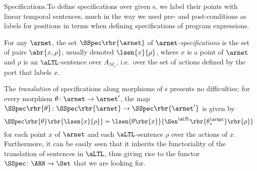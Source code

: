 \documentclass{LMCS}
\begin{document}
  \begin{minisection}{Specifications.}To define specifications over given s, we label their points with linear temporal sentences, much in the way we used pre- and post-conditions as labels for positions in terms when defining specifications of program expressions.

    \begin{defi}
      For any  \(\arnet\), the set \(\SSpec\rbr{\arnet}\) of \emph{\(\arnet\)\nb-specifications} is the set of pairs \(\abr{x, \rho}\), usually denoted \(\lsen{x}{\rho}\), where \(x\) is a point of \(\arnet\) and \(\rho\) is an \(\aLTL\)\nb-sentence over \(A_{M_{x}}\), i.e.\ over the set of actions defined by the port that labels \(x\).
    \end{defi}
    
    The \emph{translation} of specifications along morphisms of s presents no difficulties: for every morphism  \(\theta \colon \arnet \to \arnet'\), the map \(\SSpec\rbr{\theta} \colon \SSpec\rbr{\arnet} \to \SSpec\rbr{\arnet'}\) is given by
    \[
    \SSpec\rbr{\theta}\rbr{\lsen{x}{\rho}} = \lsen{\theta\rbr{x}}{\Sen^{\aLTL}\rbr{\theta^{\arnpt}_{x}}\rbr{\rho}}
    \]
    for each point \(x\) of \(\arnet\) and each \(\aLTL\)\nb-sentence \(\rho\) over the actions of \(x\).
    Furthermore, it can be easily seen that it inherits the functoriality of the translation of sentences in \(\aLTL\), thus giving rise to the functor \(\SSpec \colon \ARN \to \Set\) that we are looking for.
\end{minisection}
\end{document}
